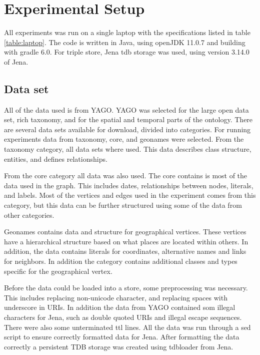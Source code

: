 \section{Experimental Setup}
\label{sec:experimentalSetup}
All experiments was run on a single laptop with the specifications listed in table \ref{table:laptop}. The code is written in Java, using openJDK 11.0.7 and building with gradle 6.0. For triple store, Jena tdb storage was used, using version 3.14.0 of Jena.


\subsection{Data set}
All of the data used is from YAGO. YAGO was selected for the large open data set, rich taxonomy, and for the spatial and temporal parts of the ontology. There are several data sets available for download, divided into categories. For running experiments data from taxonomy, core, and geonames were selected. From the taxonomy category, all data sets where used. This data describes class structure, entities, and defines relationships.

From the core category all data was also used. The core contains is most of the data used in the graph. This includes dates, relationships between nodes, literals, and labels. Most of the vertices and edges used in the experiment comes from this category, but this data can be further structured using some of the data from other categories.

Geonames contains data and structure for geographical vertices. These vertices have a hierarchical structure based on what places are located within others. In addition, the data contains literals for coordinates, alternative names and links for neighbors. In addition the category contains additional classes and types specific for the geographical vertex.

Before the data could be loaded into a store, some preprocessing was necessary. This includes replacing non-unicode character, and replacing spaces with underscore in URIs. In addition the data from YAGO contained som illegal characters for Jena, such as double quoted URIs and illegal escape sequences. There were also some unterminated ttl lines. All the data was run through a sed script to ensure correctly formatted data for Jena. After formatting the data correctly a persistent TDB storage was created using tdbloader from Jena.

